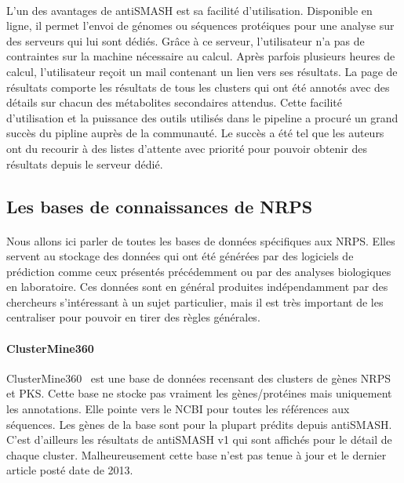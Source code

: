 \documentclass[12pt,french,twoside]{report}
\begin{document}
\paragraph{}L'un des avantages de antiSMASH est sa facilité d'utilisation.
Disponible en ligne, il permet l'envoi de génomes ou séquences protéiques pour une analyse sur des serveurs qui lui sont dédiés.
Grâce à ce serveur, l'utilisateur n'a pas de contraintes sur la machine nécessaire au calcul.
Après parfois plusieurs heures de calcul, l'utilisateur reçoit un mail contenant un lien vers ses résultats.
La page de résultats comporte les résultats de tous les clusters qui ont été annotés avec des détails sur chacun des métabolites secondaires attendus.
Cette facilité d'utilisation et la puissance des outils utilisés dans le pipeline a procuré un grand succès du pipline auprès de la communauté.
Le succès a été tel que les auteurs ont du recourir à des listes d'attente avec priorité pour pouvoir obtenir des résultats depuis le serveur dédié.



\subsection{Les bases de connaissances de NRPS}

\paragraph{}Nous allons ici parler de toutes les bases de données spécifiques aux NRPS.
Elles servent au stockage des données qui ont été générées par des logiciels de prédiction comme ceux présentés précédemment ou par des analyses biologiques en laboratoire.
Ces données sont en général produites indépendamment par des chercheurs s'intéressant à un sujet particulier, mais il est très important de les centraliser pour pouvoir en tirer des règles générales.

\paragraph{ClusterMine360}
ClusterMine360~\cite{conway_clustermine360:_2013} est une base de données recensant des clusters de gènes NRPS et PKS.
Cette base ne stocke pas vraiment les gènes/protéines mais uniquement les annotations.
Elle pointe vers le NCBI pour toutes les références aux séquences.
Les gènes de la base sont pour la plupart prédits depuis antiSMASH.
C'est d'ailleurs les résultats de antiSMASH v1 qui sont affichés pour le détail de chaque cluster.
Malheureusement cette base n'est pas tenue à jour et le dernier article posté date de 2013.
\end{document}
